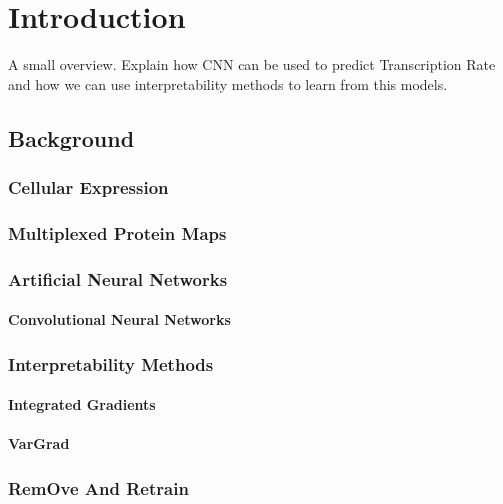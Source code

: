 \chapter{Introduction}
\label{ch:introduction}

A small overview. Explain how CNN can be used to predict Transcription Rate and how we can use interpretability methods to learn from this models.

\section{Background}
\label{sec:intro:background}

\subsection{Cellular Expression}
\label{sec:intro:cellular_expression}

\subsection{Multiplexed Protein Maps}
\label{sec:intro:multiplexed_protein_maps}



\subsection{Artificial Neural Networks}
\label{sec:intro:Cellular_Expression}


\subsubsection{Convolutional Neural Networks}
\label{sec:intro:CNN}


\subsection{Interpretability Methods}
\label{sec:intro:interpretability_methods}


\subsubsection{Integrated Gradients}
\label{sec:intro:IG}


\subsubsection{VarGrad}
\label{sec:intro:VarGrad}


\subsection{RemOve And Retrain}
\label{sec:intro:ROAR}

